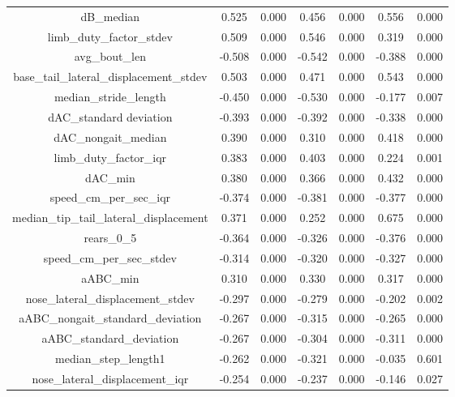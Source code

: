 \documentclass[11pt,reqno]{amsart}
\begin{document}
\begin{longtable}[c]{|c|c|c|c|c|c|c|}
dB\_median                                & 0.525    & 0.000   & 0.456  & 0.000   & 0.556   & 0.000  \\
limb\_duty\_factor\_stdev                 & 0.509    & 0.000   & 0.546  & 0.000   & 0.319   & 0.000  \\
avg\_bout\_len                            & -0.508   & 0.000   & -0.542 & 0.000   & -0.388  & 0.000  \\
base\_tail\_lateral\_displacement\_stdev  & 0.503    & 0.000   & 0.471  & 0.000   & 0.543   & 0.000  \\
median\_stride\_length                    & -0.450   & 0.000   & -0.530 & 0.000   & -0.177  & 0.007  \\
dAC\_standard deviation                   & -0.393   & 0.000   & -0.392 & 0.000   & -0.338  & 0.000  \\
dAC\_nongait\_median                      & 0.390    & 0.000   & 0.310  & 0.000   & 0.418   & 0.000  \\
limb\_duty\_factor\_iqr                   & 0.383    & 0.000   & 0.403  & 0.000   & 0.224   & 0.001  \\
dAC\_min                                  & 0.380    & 0.000   & 0.366  & 0.000   & 0.432   & 0.000  \\
speed\_cm\_per\_sec\_iqr                  & -0.374   & 0.000   & -0.381 & 0.000   & -0.377  & 0.000  \\
median\_tip\_tail\_lateral\_displacement  & 0.371    & 0.000   & 0.252  & 0.000   & 0.675   & 0.000  \\
rears\_0\_5                               & -0.364   & 0.000   & -0.326 & 0.000   & -0.376  & 0.000  \\
speed\_cm\_per\_sec\_stdev                & -0.314   & 0.000   & -0.320 & 0.000   & -0.327  & 0.000  \\
aABC\_min                                 & 0.310    & 0.000   & 0.330  & 0.000   & 0.317   & 0.000  \\
nose\_lateral\_displacement\_stdev        & -0.297   & 0.000   & -0.279 & 0.000   & -0.202  & 0.002  \\
aABC\_nongait\_standard\_deviation        & -0.267   & 0.000   & -0.315 & 0.000   & -0.265  & 0.000  \\
aABC\_standard\_deviation                 & -0.267   & 0.000   & -0.304 & 0.000   & -0.311  & 0.000  \\
median\_step\_length1                     & -0.262   & 0.000   & -0.321 & 0.000   & -0.035  & 0.601  \\
nose\_lateral\_displacement\_iqr          & -0.254   & 0.000   & -0.237 & 0.000   & -0.146  & 0.027  \\

\end{longtable}
\end{document}
